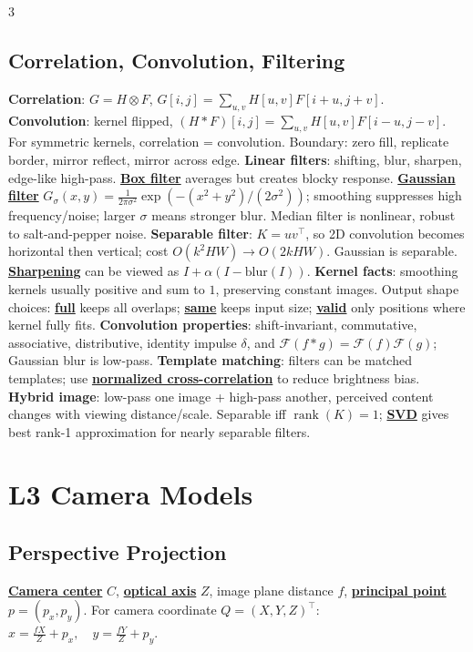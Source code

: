 \documentclass{article}
\numberwithin{equation}{subsection}
\newcommand{\key}[1]{\textbf{#1}}
\newcommand{\lowterm}[1]{\textbf{\underline{#1}}}
\begin{document}
\begin{multicols*}{3}
\subsection{Correlation, Convolution, Filtering}
\key{Correlation}: $G=H\otimes F$, $G[i,j]=\sum_{u,v}H[u,v]F[i+u,j+v]$. \key{Convolution}: kernel flipped, $(H*F)[i,j]=\sum_{u,v}H[u,v]F[i-u,j-v]$. For symmetric kernels, correlation = convolution. Boundary: zero fill, replicate border, mirror reflect, mirror across edge.
\key{Linear filters}: shifting, blur, sharpen, edge-like high-pass. \lowterm{Box filter} averages but creates blocky response. \lowterm{Gaussian filter}
$G_\sigma(x,y)=\frac{1}{2\pi\sigma^2}\exp(-(x^2+y^2)/(2\sigma^2))$; smoothing suppresses high frequency/noise; larger $\sigma$ means stronger blur. Median filter is nonlinear, robust to salt-and-pepper noise.
\key{Separable filter}: $K=uv^\top$, so 2D convolution becomes horizontal then vertical; cost $O(k^2HW)\to O(2kHW)$. Gaussian is separable. \lowterm{Sharpening} can be viewed as $I+\alpha(I-\mathrm{blur}(I))$.
\key{Kernel facts}: smoothing kernels usually positive and sum to $1$, preserving constant images. Output shape choices: \lowterm{full} keeps all overlaps; \lowterm{same} keeps input size; \lowterm{valid} only positions where kernel fully fits. \key{Convolution properties}: shift-invariant, commutative, associative, distributive, identity impulse $\delta$, and $\mathcal F(f*g)=\mathcal F(f)\mathcal F(g)$; Gaussian blur is low-pass. \key{Template matching}: filters can be matched templates; use \lowterm{normalized cross-correlation} to reduce brightness bias. \key{Hybrid image}: low-pass one image + high-pass another, perceived content changes with viewing distance/scale. Separable iff $\operatorname{rank}(K)=1$; \lowterm{SVD} gives best rank-1 approximation for nearly separable filters.

\section{L3 Camera Models}
\subsection{Perspective Projection}
\lowterm{Camera center} $C$, \lowterm{optical axis} $Z$, image plane distance $f$, \lowterm{principal point} $p=(p_x,p_y)$. For camera coordinate $Q=(X,Y,Z)^\top$:
\(
x=\frac{fX}{Z}+p_x,\quad y=\frac{fY}{Z}+p_y .
\)


\end{multicols*}
\end{document}
